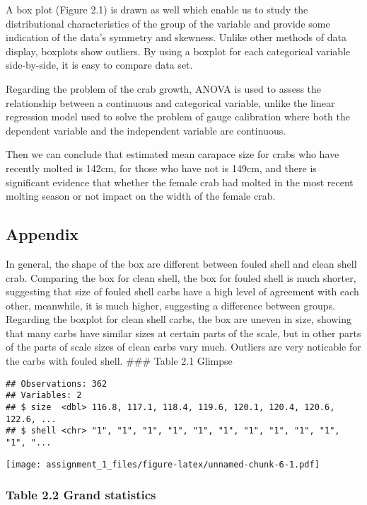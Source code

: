\documentclass[]{article}
\begin{document}
A box plot (Figure 2.1) is drawn as well which enable us to study the
distributional characteristics of the group of the variable and provide
some indication of the data's symmetry and skewness. Unlike other
methods of data display, boxplots show outliers. By using a boxplot for
each categorical variable side-by-side, it is easy to compare data set.

Regarding the problem of the crab growth, ANOVA is used to assess the
relationship between a continuous and categorical variable, unlike the
linear regression model used to solve the problem of gauge calibration
where both the dependent variable and the independent variable are
continuous.

Then we can conclude that estimated mean carapace size for crabs who
have recently molted is 142cm, for those who have not is 149cm, and
there is significant evidence that whether the female crab had molted in
the most recent molting season or not impact on the width of the female
crab.

\subsection{Appendix}\label{appendix-1}

In general, the shape of the box are different between fouled shell and
clean shell crab. Comparing the box for clean shell, the box for fouled
shell is much shorter, suggesting that size of fouled shell carbs have a
high level of agreement with each other, meanwhile, it is much higher,
suggesting a difference between groups. Regarding the boxplot for clean
shell carbs, the box are uneven in size, showing that many carbs have
similar sizes at certain parts of the scale, but in other parts of the
parts of scale sizes of clean carbs vary much. Outliers are very
noticable for the carbs with fouled shell. \#\#\# Table 2.1 Glimpse

\begin{verbatim}
## Observations: 362
## Variables: 2
## $ size  <dbl> 116.8, 117.1, 118.4, 119.6, 120.1, 120.4, 120.6, 122.6, ...
## $ shell <chr> "1", "1", "1", "1", "1", "1", "1", "1", "1", "1", "1", "...
\end{verbatim}

\texttt{[image: assignment\_1\_files/figure-latex/unnamed-chunk-6-1.pdf]}

\subsubsection{Table 2.2 Grand
statistics}\label{table-2.2-grand-statistics}
\end{document}
